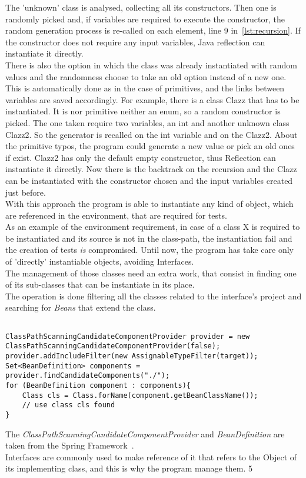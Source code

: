 The 'unknown' class is analysed, collecting all its constructors.
Then one is randomly picked and, if variables are required to execute the constructor, the random generation process is re-called on each element, line 9 in~\ref{lst:recursion}.
If the constructor does not require any input variables, Java reflection can instantiate it directly.\\
There is also the option in which the class was already instantiated with random values and the randomness choose to take an old option instead of a new one.
This is automatically done as in the case of primitives, and the links between variables are saved accordingly.
For example, there is a class Clazz that has to be instantiated.
It is nor primitive neither an enum, so a random constructor is picked.
The one taken require two variables, an int and another unknown class Clazz2.
So the generator is recalled on the int variable and on the Clazz2.
About the primitive typos, the program could generate a new value or pick an old ones if exist.
Clazz2 has only the default empty constructor, thus Reflection can instantiate it directly.
Now there is the backtrack on the recursion and the Clazz can be instantiated with the constructor chosen and the input variables created just before.\\
With this approach the program is able to instantiate any kind of object, which are referenced in the environment, that are required for tests.\\
As an example of the environment requirement, in case of a class X is required to be instantiated and its source is not in the class-path, the instantiation fail and the creation of tests \emph{is} compromised.
Until now, the program has take care only of 'directly' instantiable objects, avoiding Interfaces.\\
The management of those classes need an extra work, that consist in finding one of its sub-classes that can be instantiate in its place.\\
The operation is done filtering all the classes related to the interface's project and searching for \emph{Beans} that extend the class.\\
\begin{lstlisting}[caption={how to find a sub-class of an interface},label={lst:interfaceMngmnt}]% Start your code-block

ClassPathScanningCandidateComponentProvider provider = new ClassPathScanningCandidateComponentProvider(false);
provider.addIncludeFilter(new AssignableTypeFilter(target));
Set<BeanDefinition> components = provider.findCandidateComponents("./");
for (BeanDefinition component : components){
	Class cls = Class.forName(component.getBeanClassName());
	// use class cls found
}
\end{lstlisting}
The \emph{ClassPathScanningCandidateComponentProvider} and \emph{BeanDefinition} are taken from the Spring Framework~\cite{springFramework}.\\
Interfaces are commonly used to make reference of it that refers to the Object of its implementing class, and this is why the program manage them. 5